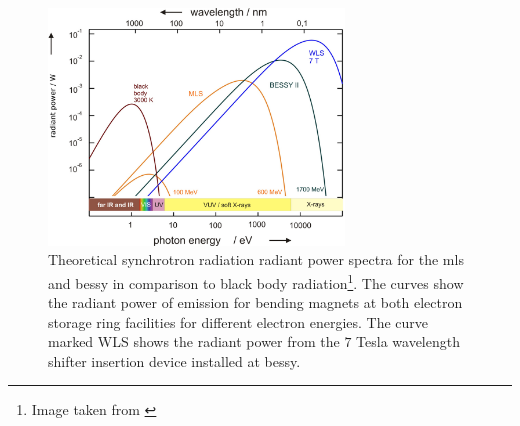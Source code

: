 \begin{figure}
 \includegraphics[width=0.7\textwidth]{img/exp-bessy-dipole-spectrum.jpeg}
 \caption[Theoretical synchrotron radiation radiant power spectra]{Theoretical synchrotron radiation radiant power spectra for the \gls{mls} and \gls{bessy} in comparison to black body radiation\footnote{Image taken from \textcite{beckhoff_quarter-century_2009}}. The curves show the radiant power of emission for bending magnets at both electron storage ring facilities for different electron energies. The curve marked WLS shows the radiant power from the $7$ Tesla wavelength shifter insertion device installed at \gls{bessy}.}
 \label{ch_exp:fig_experimental_synchrotron_spectra}
\end{figure}

